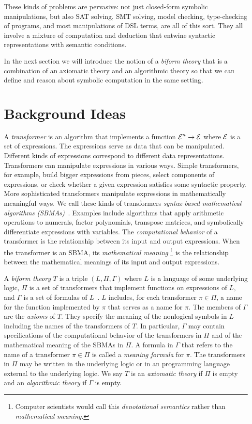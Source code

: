 \documentclass[fleqn]{llncs}
\begin{document}
These kinds of problems are pervasive: not just closed-form symbolic
manipulations, but also SAT solving, SMT solving, model checking,
type-checking of programs, and most manipulations of DSL terms, are
all of this sort.  They all involve a mixture of computation and
deduction that entwine syntactic representations with semantic
conditions.

In the next section we will introduce the notion of a \emph{biform
  theory} that is a combination of an axiomatic theory and an
algorithmic theory so that we can define and reason about symbolic
computation in the same setting.

\section{Background Ideas}

A \emph{transformer} is an algorithm that implements a function $\mbox{$\cal E$}^n
\rightarrow \mbox{$\cal E$}$ where $\mbox{$\cal E$}$ is a set of expressions.  The expressions
serve as data that can be manipulated.  Different kinds of expressions
correspond to different data representations.  Transformers can
manipulate expressions in various ways.  Simple transformers, for
example, build bigger expressions from pieces, select components of
expressions, or check whether a given expression satisfies some
syntactic property.  More sophisticated transformers manipulate
expressions in mathematically meaningful ways.  We call these kinds of
transformers \emph{syntax-based mathematical algorithms
  (SBMAs)}~\cite{Farmer13}.  Examples include algorithms that apply
arithmetic operations to numerals, factor polynomials, transpose
matrices, and symbolically differentiate expressions with variables.
The \emph{computational behavior} of a transformer is the relationship
between its input and output expressions.  When the transformer is an
SBMA, its \emph{mathematical meaning}%
\footnote{Computer scientists would call this \emph{denotational semantics}
rather than \emph{mathematical meaning}.} is the relationship between the
mathematical meanings of its input and output expressions.

A \emph{biform theory} $T$ is a triple $(L,\Pi,\Gamma)$ where $L$ is a
language of some underlying logic, $\Pi$ is a set of transformers that
implement functions on expressions of $L$, and $\Gamma$ is a set of
formulas of
$L$~\cite{CaretteFarmer08,Farmer07b,FarmerMohrenschildt03}.  $L$
includes, for each transformer $\pi \in \Pi$, a name for the function
implemented by $\pi$ that serves as a name for $\pi$.  The members of
$\Gamma$ are the \emph{axioms} of $T$.  They specify the meaning of
the nonlogical symbols in $L$ including the names of the transformers
of $T$.  In particular, $\Gamma$ may contain specifications of the
computational behavior of the transformers in $\Pi$ and of the
mathematical meaning of the SBMAs in $\Pi$.  A formula in $\Gamma$
that refers to the name of a transformer $\pi \in \Pi$ is called a
\emph{meaning formula} for $\pi$.  The transformers in $\Pi$ may be
written in the underlying logic or in an programming language external
to the underlying logic.  We say $T$ is an \emph{axiomatic theory} if
$\Pi$ is empty and an \emph{algorithmic theory} if $\Gamma$ is empty.
\end{document}

